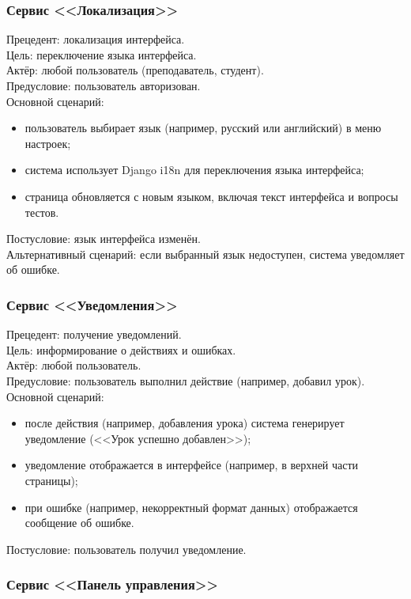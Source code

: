 \subsubsection {Сервис <<Локализация>>}
	
	{Прецедент: локализация интерфейса}. \\
	{Цель}: переключение языка интерфейса. \\
	{Актёр}: любой пользователь (преподаватель, студент). \\
	{Предусловие}: пользователь авторизован. \\
	{Основной сценарий}:
	\begin{itemize}
		\item пользователь выбирает язык (например, русский или английский) в меню настроек;
		\item система использует Django i18n для переключения языка интерфейса;
		\item страница обновляется с новым языком, включая текст интерфейса и вопросы тестов.
	\end{itemize}
	{Постусловие}: язык интерфейса изменён. \\
	{Альтернативный сценарий}: если выбранный язык недоступен, система уведомляет об ошибке.
	
\subsubsection {Сервис <<Уведомления>>}
	
	{Прецедент: получение уведомлений}. \\
	{Цель}: информирование о действиях и ошибках. \\
	{Актёр}: любой пользователь. \\
	{Предусловие}: пользователь выполнил действие (например, добавил урок). \\
	{Основной сценарий}:
	\begin{itemize}
		\item после действия (например, добавления урока) система генерирует уведомление (<<Урок успешно добавлен>>);
		\item уведомление отображается в интерфейсе (например, в верхней части страницы);
		\item при ошибке (например, некорректный формат данных) отображается сообщение об ошибке.
	\end{itemize}
	{Постусловие}: пользователь получил уведомление.
	
\subsubsection {Сервис <<Панель управления>>}
	
